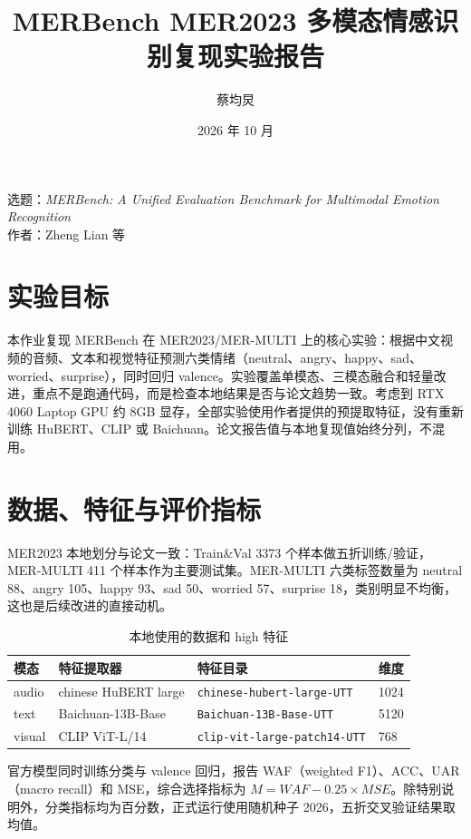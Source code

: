 ﻿\documentclass[a4paper,11pt]{ctexart}
\title{MERBench MER2023 多模态情感识别复现实验报告}
\author{蔡均炅\quad 2026210870}
\date{2026 年 10 月}
\begin{document}
\maketitle
{}

选题：\textit{MERBench: A Unified Evaluation Benchmark for Multimodal Emotion Recognition}\\
作者：Zheng Lian 等

\section{实验目标}

本作业复现 MERBench 在 MER2023/MER-MULTI 上的核心实验：根据中文视频的音频、文本和视觉特征预测六类情绪（neutral、angry、happy、sad、worried、surprise），同时回归 valence。实验覆盖单模态、三模态融合和轻量改进，重点不是跑通代码，而是检查本地结果是否与论文趋势一致。考虑到 RTX 4060 Laptop GPU 约 8GB 显存，全部实验使用作者提供的预提取特征，没有重新训练 HuBERT、CLIP 或 Baichuan。论文报告值与本地复现值始终分列，不混用。

\section{数据、特征与评价指标}

MER2023 本地划分与论文一致：Train\&Val 3373 个样本做五折训练/验证，MER-MULTI 411 个样本作为主要测试集。MER-MULTI 六类标签数量为 neutral 88、angry 105、happy 93、sad 50、worried 57、surprise 18，类别明显不均衡，这也是后续改进的直接动机。

\begin{table}[htbp]
\centering
\small
\caption{本地使用的数据和 high 特征}
\begin{tabular}{llll}
\toprule
模态 & 特征提取器 & 特征目录 & 维度\\
\midrule
audio & chinese HuBERT large & \texttt{chinese-hubert-large-UTT} & 1024\\
text & Baichuan-13B-Base & \texttt{Baichuan-13B-Base-UTT} & 5120\\
visual & CLIP ViT-L/14 & \texttt{clip-vit-large-patch14-UTT} & 768\\
\bottomrule
\end{tabular}
\end{table}

官方模型同时训练分类与 valence 回归，报告 WAF（weighted F1）、ACC、UAR（macro recall）和 MSE，综合选择指标为 $M=WAF-0.25\times MSE$。除特别说明外，分类指标均为百分数，正式运行使用随机种子 2026，五折交叉验证结果取均值。
\end{document}
